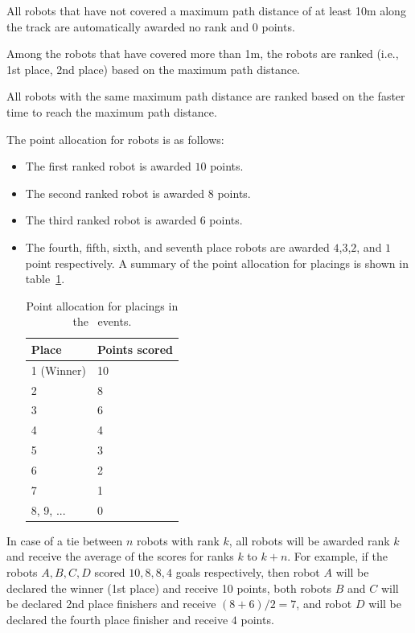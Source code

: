 \documentclass[12pt]{hurocup}
\begin{document}
\begin{lawlist}[MR]
\item All robots that have not covered a maximum path distance of at least
  10m along the track are automatically awarded no rank and $0$
  points.
\item Among the robots that have covered more than 1m, the robots are
  ranked (i.e., 1st place, 2nd place) based on the maximum path distance.
\item All robots with the same maximum path distance are ranked based
  on the faster time to reach the maximum path distance.

\item The point allocation for robots is as follows:
  \begin{itemize}
  \item The first ranked robot is awarded $10$ points.
  \item The second ranked robot is awarded $8$ points.
  \item The third ranked robot is awarded $6$ points.
  \item The fourth, fifth, sixth, and seventh place robots are awarded
    $4$,$3$,$2$, and $1$ point respectively.  A summary of the point
    allocation for placings is shown in table~\ref{point-allocation}.

    \begin{table}
      \begin{center}
        \begin{tabular}{l|l}
          \hline
          Place & Points scored \\
          \hline
          1 (Winner) & 10 \\
          2          & 8 \\
          3          & 6 \\
          4          & 4 \\
          5          & 3 \\
          6          & 2 \\
          7          & 1 \\
          8, 9, ...  & 0 \\
          \hline
        \end{tabular}
      \end{center}
      \caption{Point allocation for placings in the \HuroCup\ events.}
      \label{point-allocation}
    \end{table}
  \end{itemize}

\item In case of a tie between $n$ robots with rank $k$, all robots
 will be awarded rank $k$ and receive the average of the scores for
 ranks $k$ to $k+n$.  For example, if the robots $A,B,C,D$ scored $10,
 8, 8, 4$ goals respectively, then robot $A$ will be declared the
 winner (1st place) and receive 10 points, both robots $B$ and $C$
 will be declared 2nd place finishers and receive $(8+6)/2=7$, and
 robot $D$ will be declared the fourth place finisher and receive $4$
 points.

\end{lawlist}
\end{document}
